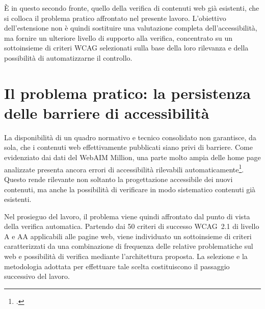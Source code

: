 È in questo secondo fronte, quello della verifica di contenuti web già esistenti, che si colloca il problema pratico affrontato nel presente lavoro. L'obiettivo dell'estensione non è quindi sostituire una valutazione completa dell'accessibilità, ma fornire un ulteriore livello di supporto alla verifica, concentrato su un sottoinsieme di criteri WCAG selezionati sulla base della loro rilevanza e della possibilità di automatizzarne il controllo.

\section{Il problema pratico: la persistenza delle barriere di accessibilità}

\label{sec:problema-pratico}

La disponibilità di un quadro normativo e tecnico consolidato non garantisce, da sola, che i contenuti web effettivamente pubblicati siano privi di barriere. Come evidenziato dai dati del WebAIM Million, una parte molto ampia delle home page analizzate presenta ancora errori di accessibilità rilevabili automaticamente\footcite{webaim:million2026}. Questo rende rilevante non soltanto la progettazione accessibile dei nuovi contenuti, ma anche la possibilità di verificare in modo sistematico contenuti già esistenti.

Nel prosieguo del lavoro, il problema viene quindi affrontato dal punto di vista della verifica automatica. Partendo dai 50 criteri di successo WCAG~2.1 di livello A e AA applicabili alle pagine web, viene individuato un sottoinsieme di criteri caratterizzati da una combinazione di frequenza delle relative problematiche sul web e possibilità di verifica mediante l'architettura proposta. La selezione e la metodologia adottata per effettuare tale scelta costituiscono il passaggio successivo del lavoro.
